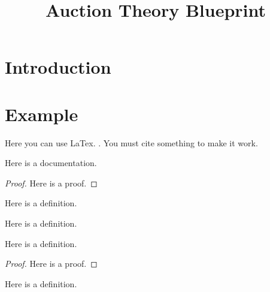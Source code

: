 \title{Auction Theory Blueprint} 




\maketitle


\tableofcontents
\section{Introduction}



\section{Example}
Here you can use LaTex. \cite{marcus}. You must cite something to make it work.

\begin{lemma}\label{two_different_elements}
    \leanok
    Here is a documentation.
\end{lemma}

\begin{proof}
    Here is a proof.
\end{proof}

\begin{definition}\label{Auction}
    \leanok
    Here is a definition.
\end{definition}

\begin{definition}\label{maxb}
    \leanok
    Here is a definition.
\end{definition}

\begin{lemma}\label{exists_max}
    \leanok
    Here is a definition.
\end{lemma}
\begin{proof}
    Here is a proof.
\end{proof}


\begin{definition}\label{winner}
    \leanok
    Here is a definition.
\end{definition}

